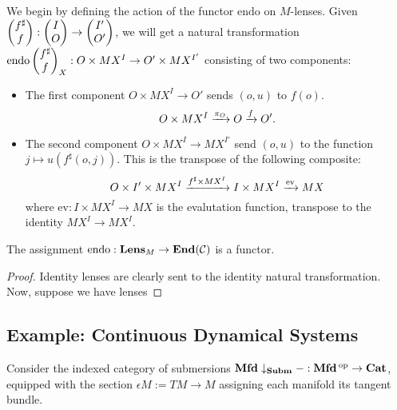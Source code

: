 We begin by defining the action of the functor $\text{endo}$ on $M$-lenses.
Given $\begin{pmatrix}{f^{\sharp}} \\ {f} \end{pmatrix} : \begin{pmatrix}{I} \\ {O} \end{pmatrix} \to \begin{pmatrix}{I'} \\ {O'} \end{pmatrix}$, we will get a
natural transformation $\text{endo}\begin{pmatrix}{f^{\sharp}} \\ {f} \end{pmatrix}_X : O \times MX^I \to O'
\times MX^{I'}$ consisting of two components:
\begin{itemize}
\item The first component $O \times MX^I \to O'$ sends $(o, u)$ to $f(o)$.
$$O \times MX^I \xrightarrow{\pi_O} O \xrightarrow{f} O'.$$
\item The second component $O \times MX^I \to MX^{I'}$ send $(o, u)$ to the
  function $j \mapsto u(f^{\sharp}(o, j))$. This is the transpose of the
  following composite:
$$O \times I' \times MX^I \xrightarrow{f^{\sharp} \times MX^I} I \times MX^I
\xrightarrow{\text{ev}} MX$$
where $\text{ev} : I \times MX^I \to MX$ is the evalutation function, transpose
to the identity $MX^I \to MX^I$.
\end{itemize}

\begin{prop}
The assignment $\text{endo}: \textbf{Lens}_M \to \textbf{End}(\operatorname{\mathcal{C}})$ is a functor.
\end{prop}
\begin{proof}
Identity lenses are clearly sent to the identity natural transformation. Now,
suppose we have lenses
\end{proof}




\subsection{Example: Continuous Dynamical Systems}

Consider the indexed category of submersions $\textbf{Mfd}
\downarrow_{\textbf{Subm}} - : \textbf{Mfd}\operatorname{^\text{op}} \to \operatorname{\textbf{Cat}}$, equipped with the
section $\epsilon M := TM \to M$ assigning each manifold its tangent bundle.


